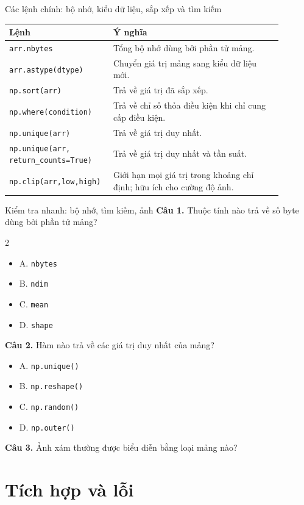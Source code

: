\documentclass[aspectratio=169,11pt]{beamer}
\newcommand{\quiztitle}[1]{\textbf{\textcolor{QuizOrange}{#1}}}
\begin{document}
\begin{frame}{Các lệnh chính: bộ nhớ, kiểu dữ liệu, sắp xếp và tìm kiếm}
\scriptsize
\begin{tabular}{p{0.30\linewidth}p{0.59\linewidth}}
\toprule
\textbf{Lệnh} & \textbf{Ý nghĩa} \\
\midrule
\texttt{arr.nbytes} & Tổng bộ nhớ dùng bởi phần tử mảng. \\
\texttt{arr.astype(dtype)} & Chuyển giá trị mảng sang kiểu dữ liệu mới. \\
\texttt{np.sort(arr)} & Trả về giá trị đã sắp xếp. \\
\texttt{np.where(condition)} & Trả về chỉ số thỏa điều kiện khi chỉ cung cấp điều kiện. \\
\texttt{np.unique(arr)} & Trả về giá trị duy nhất. \\
\texttt{np.unique(arr, return\_counts=True)} & Trả về giá trị duy nhất và tần suất. \\
\texttt{np.clip(arr,low,high)} & Giới hạn mọi giá trị trong khoảng chỉ định; hữu ích cho cường độ ảnh. \\
\bottomrule
\end{tabular}
\end{frame}

\begin{frame}{Kiểm tra nhanh: bộ nhớ, tìm kiếm, ảnh}
\small
\quiztitle{Câu 1.} Thuộc tính nào trả về số byte dùng bởi phần tử mảng?
\begin{multicols}{2}
\begin{itemize}
  \item A. \texttt{nbytes}
  \item B. \texttt{ndim}
  \item C. \texttt{mean}
  \item D. \texttt{shape}
\end{itemize}
\end{multicols}
\quiztitle{Câu 2.} Hàm nào trả về các giá trị duy nhất của mảng?
\begin{itemize}
  \item A. \texttt{np.unique()}
  \item B. \texttt{np.reshape()}
  \item C. \texttt{np.random()}
  \item D. \texttt{np.outer()}
\end{itemize}
\quiztitle{Câu 3.} Ảnh xám thường được biểu diễn bằng loại mảng nào?
\end{frame}

\section{Tích hợp và lỗi}
\end{document}
